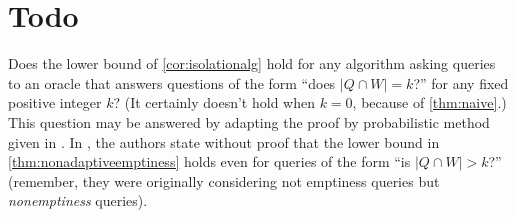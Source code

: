 \documentclass{article}
\begin{document}
\section{Todo}

Does the lower bound of \autoref{cor:isolationalg} hold for any algorithm asking queries to an oracle that answers questions of the form ``does $|Q \cap W| = k$?'' for any fixed positive integer $k$?
(It certainly doesn't hold when $k = 0$, because of \autoref{thm:naive}.)
This question may be answered by adapting the proof by probabilistic method given in \autocite{ablp91}.
In \autocite[Remark~2]{krw12}, the authors state without proof that the lower bound in \autoref{thm:nonadaptiveemptiness} holds even for queries of the form ``is $|Q \cap W| > k$?'' (remember, they were originally considering not emptiness queries but \emph{nonemptiness} queries).

\printbibliography{}
\end{document}
